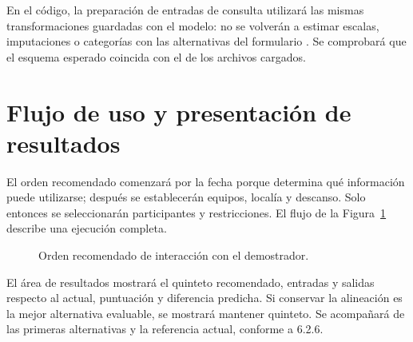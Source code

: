 En el código, la preparación de entradas de consulta utilizará las mismas transformaciones guardadas con el modelo: no se volverán a estimar escalas, imputaciones o categorías con las alternativas del formulario \cite{sklearnCommonPitfallsPonderacion}. Se comprobará que el esquema esperado coincida con el de los archivos cargados.

\section{Flujo de uso y presentación de resultados}
\label{sec:flujo-interfaz-pruebas}
El orden recomendado comenzará por la fecha porque determina qué información puede utilizarse; después se establecerán equipos, localía y descanso. Solo entonces se seleccionarán participantes y restricciones. El flujo de la Figura~\ref{fig:flujo-interfaz-pruebas} describe una ejecución completa.

\begin{figure}[htbp]
\centering
{}
\caption{Orden recomendado de interacción con el demostrador.}
\label{fig:flujo-interfaz-pruebas}
\end{figure}

El área de resultados mostrará el quinteto recomendado, entradas y salidas respecto al actual, puntuación y diferencia predicha. Si conservar la alineación es la mejor alternativa evaluable, se mostrará mantener quinteto. Se acompañará de las primeras alternativas y la referencia actual, conforme a 6.2.6.

